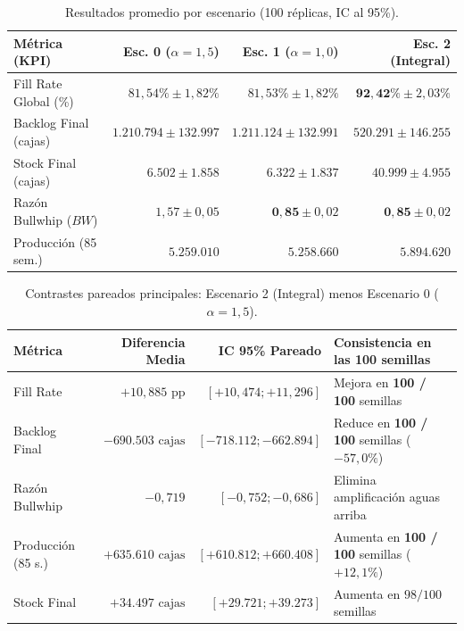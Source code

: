 \documentclass[11pt, a4paper]{article}
\begin{document}
\begin{table}[H]
\centering
\small
\caption{Resultados promedio por escenario (100 réplicas, IC al 95\%).}
\label{tab:res_exp}
\begin{tabularx}{\textwidth}{l R R R}
\toprule
\textbf{Métrica (KPI)} & \textbf{Esc. 0 ($\alpha=1,5$)} & \textbf{Esc. 1 ($\alpha=1,0$)} & \textbf{Esc. 2 (Integral)} \\
\midrule
Fill Rate Global (\%)      & $81,54\% \pm 1,82\%$       & $81,53\% \pm 1,82\%$       & $\mathbf{92,42\%} \pm 2,03\%$ \\
Backlog Final (cajas)      & $1.210.794 \pm 132.997$    & $1.211.124 \pm 132.991$    & $\mathbf{520.291} \pm 146.255$ \\
Stock Final (cajas)        & $6.502 \pm 1.858$          & $6.322 \pm 1.837$          & $\mathbf{40.999} \pm 4.955$ \\
Razón Bullwhip ($BW$)      & $1,57 \pm 0,05$            & $\mathbf{0,85} \pm 0,02$   & $\mathbf{0,85} \pm 0,02$ \\
Producción (85 sem.)       & $5.259.010$                & $5.258.660$                & $\mathbf{5.894.620}$ \\
\bottomrule
\end{tabularx}
\end{table}

\begin{table}[H]
\centering
\small
\caption{Contrastes pareados principales: Escenario 2 (Integral) menos Escenario 0 ($\alpha=1,5$).}
\label{tab:pareados_exp}
\begin{tabularx}{\textwidth}{l R R L}
\toprule
\textbf{Métrica} & \textbf{Diferencia Media} & \textbf{IC 95\% Pareado} & \textbf{Consistencia en las 100 semillas} \\
\midrule
Fill Rate          & $+10,885\text{ pp}$       & $[+10,474 ; +11,296]$       & Mejora en \textbf{100 / 100} semillas \\
Backlog Final      & $-690.503\text{ cajas}$   & $[-718.112 ; -662.894]$     & Reduce en \textbf{100 / 100} semillas ($-57,0\%$) \\
Razón Bullwhip     & $-0,719$                  & $[-0,752 ; -0,686]$         & Elimina amplificación aguas arriba \\
Producción (85 s.) & $+635.610\text{ cajas}$   & $[+610.812 ; +660.408]$     & Aumenta en \textbf{100 / 100} semillas ($+12,1\%$) \\
Stock Final        & $+34.497\text{ cajas}$    & $[+29.721 ; +39.273]$       & Aumenta en $98 / 100$ semillas \\
\bottomrule
\end{tabularx}
\end{table}
\end{document}
